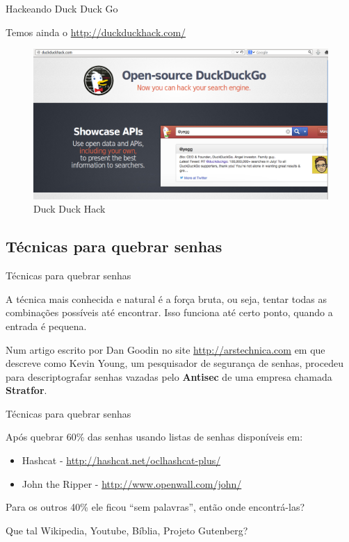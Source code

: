 \begin{frame}{Hackeando Duck Duck Go}

Temos ainda o \url{http://duckduckhack.com/}

\begin{figure}
    \includegraphics[scale=0.25]{img/duckduckhack.png}
    \caption{Duck Duck Hack}
\end{figure}

\end{frame}

\begin{frame}


\end{frame}

\subsection{Técnicas para quebrar
senhas}\label{tuxe9cnicas-para-quebrar-senhas}

\begin{frame}{Técnicas para quebrar senhas}

A técnica mais conhecida e natural é a força bruta, ou seja, tentar
todas as combinações possíveis até encontrar. Isso funciona até certo
ponto, quando a entrada é pequena.

Num artigo escrito por Dan Goodin no site \url{http://arstechnica.com}
em que descreve como Kevin Young, um pesquisador de segurança de senhas,
procedeu para descriptografar senhas vazadas pelo \textbf{Antisec} de
uma empresa chamada \textbf{Stratfor}.

\end{frame}

\begin{frame}{Técnicas para quebrar senhas}

Após quebrar 60\% das senhas usando listas de senhas disponíveis em:

\begin{itemize}
\itemsep1pt\parskip0pt
\item
  Hashcat - \url{http://hashcat.net/oclhashcat-plus/}
\item
  John the Ripper - \url{http://www.openwall.com/john/}
\end{itemize}

Para os outros 40\% ele ficou ``sem palavras'', então onde encontrá-las?

Que tal Wikipedia, Youtube, Bíblia, Projeto Gutenberg?

\end{frame}


